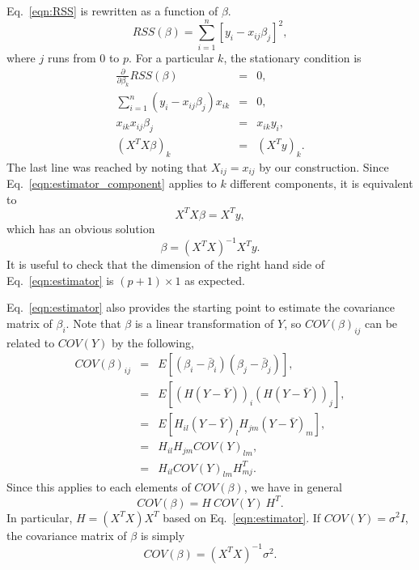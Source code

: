 Eq.~\ref{eqn:RSS} is rewritten as a function of $\beta$.
\begin{equation}
RSS(\beta) = \sum_{i=1}^{n}\left[ y_i - x_{ij}\beta_j\right]^2,
\end{equation}
where $j$ runs from $0$ to $p$. For a particular $k$, the stationary condition is
\begin{eqnarray}
\frac{\partial}{\partial\beta_k}RSS(\beta) &=& 0, \\
\sum_{i=1}^{n}\left(y_i-x_{ij}\beta_j\right)x_{ik} & = & 0,\\
x_{ik}x_{ij}\beta_j &=& x_{ik}y_i, \\
(X^TX\beta)_k &=& (X^Ty)_k.\label{eqn:estimator_component}
\end{eqnarray} 
The last line was reached by noting that $X_{ij}=x_{ij}$ by our construction. Since Eq.~\ref{eqn:estimator_component} applies to $k$ different components, it is equivalent to
\begin{equation}
X^TX\beta = X^Ty,
\end{equation}
which has an obvious solution
\begin{equation}
	\beta = (X^TX)^{-1}X^Ty.\label{eqn:estimator}
\end{equation}
It is useful to check that the dimension of the right hand side of Eq.~\ref{eqn:estimator} is $(p+1)\times1$ as expected.

Eq.~\ref{eqn:estimator} also provides the starting point to estimate the covariance matrix of $\beta_i$. Note that $\beta$ is a linear transformation of $Y$, so $COV(\beta)_{ij}$ can be related to $COV(Y)$ by the following,
\begin{eqnarray}
	COV(\beta)_{ij} &=& E[(\beta_i-\bar\beta_i)(\beta_j-\bar\beta_j)],\\
		       &=&E[(H(Y-\bar Y))_i(H(Y-\bar Y))_j],\\
		       &=&E[H_{il}(Y-\bar Y)_{l}H_{jm}(Y-\bar Y)_{m}],\\
		       &=&H_{il}H_{jm}COV(Y)_{lm},\\
			&=&H_{il}COV(Y)_{lm}H^T_{mj}.
\end{eqnarray}
Since this applies to each elements of $COV(\beta)$, we have in general
\begin{equation}
	COV(\beta) = H\ COV(Y)\ H^T.
\end{equation}
In particular, $H=(X^TX)X^T$ based on Eq.~\ref{eqn:estimator}. If $COV(Y)=\sigma^2I$, the covariance matrix of $\beta$ is simply
\begin{equation}
	COV(\beta) = (X^TX)^{-1}\sigma^2.
\end{equation}

